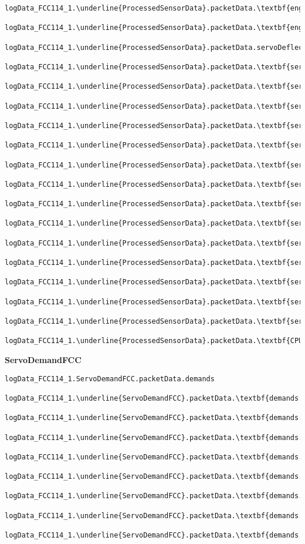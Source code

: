 \documentclass[10pt]{extarticle}
\begin{document}
\begin{Verbatim}[baselinestretch=.9,commandchars=\\\{\}]
logData_FCC114_1.\underline{ProcessedSensorData}.packetData.\textbf{engineDischarge}

logData_FCC114_1.\underline{ProcessedSensorData}.packetData.\textbf{engineSwitch}

logData_FCC114_1.\underline{ProcessedSensorData}.packetData.servoDeflections
    logData_FCC114_1.\underline{ProcessedSensorData}.packetData.\textbf{servoDeflections.stbdFlap}
    logData_FCC114_1.\underline{ProcessedSensorData}.packetData.\textbf{servoDeflections.DF_portAileron}
    logData_FCC114_1.\underline{ProcessedSensorData}.packetData.\textbf{servoDeflections.portAileron}
    logData_FCC114_1.\underline{ProcessedSensorData}.packetData.\textbf{servoDeflections.DF_stbdAileron}
    logData_FCC114_1.\underline{ProcessedSensorData}.packetData.\textbf{servoDeflections.stbdAileron}
    logData_FCC114_1.\underline{ProcessedSensorData}.packetData.\textbf{servoDeflections.DF_portElevator}
    logData_FCC114_1.\underline{ProcessedSensorData}.packetData.\textbf{servoDeflections.portElevator}
    logData_FCC114_1.\underline{ProcessedSensorData}.packetData.\textbf{servoDeflections.DF_stbdElevator}
    logData_FCC114_1.\underline{ProcessedSensorData}.packetData.\textbf{servoDeflections.stbdElevator}
    logData_FCC114_1.\underline{ProcessedSensorData}.packetData.\textbf{servoDeflections.DF_rudder}
    logData_FCC114_1.\underline{ProcessedSensorData}.packetData.\textbf{servoDeflections.rudder}
    logData_FCC114_1.\underline{ProcessedSensorData}.packetData.\textbf{servoDeflections.DF_portFlap}
    logData_FCC114_1.\underline{ProcessedSensorData}.packetData.\textbf{servoDeflections.portFlap}
    logData_FCC114_1.\underline{ProcessedSensorData}.packetData.\textbf{servoDeflections.DF_stbdFlap}
	
logData_FCC114_1.\underline{ProcessedSensorData}.packetData.\textbf{CPU_Temperature}
\end{Verbatim}
\newpage
{\Large \textbf{ServoDemandFCC}}
\begin{Verbatim}[baselinestretch=.9,commandchars=\\\{\}]
logData_FCC114_1.ServoDemandFCC.packetData.demands
    logData_FCC114_1.\underline{ServoDemandFCC}.packetData.\textbf{demands.flags}
    logData_FCC114_1.\underline{ServoDemandFCC}.packetData.\textbf{demands.throttle}
    logData_FCC114_1.\underline{ServoDemandFCC}.packetData.\textbf{demands.port_aileron}
    logData_FCC114_1.\underline{ServoDemandFCC}.packetData.\textbf{demands.stbd_aileron}
    logData_FCC114_1.\underline{ServoDemandFCC}.packetData.\textbf{demands.port_flap}
    logData_FCC114_1.\underline{ServoDemandFCC}.packetData.\textbf{demands.stbd_flap}
    logData_FCC114_1.\underline{ServoDemandFCC}.packetData.\textbf{demands.rudder}
    logData_FCC114_1.\underline{ServoDemandFCC}.packetData.\textbf{demands.elevator}
\end{Verbatim}
\end{document}

